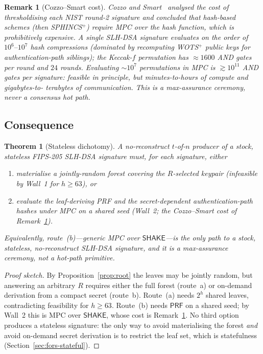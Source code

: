 \documentclass[11pt,a4paper]{article}
\newtheorem{theorem}{Theorem}
\newtheorem{remark}{Remark}
\newcommand{\PRF}{\mathsf{PRF}}
\begin{document}
\begin{remark}[Cozzo--Smart cost]
\label{rem:cs}
Cozzo and Smart~\cite{cozzosmart} analysed the cost of thresholdising each NIST
round-2 signature and concluded that hash-based schemes (then SPHINCS$^+$) require
MPC over the hash function, which is prohibitively expensive. A single SLH-DSA
signature evaluates on the order of $10^{6}\text{--}10^{7}$ hash compressions
(dominated by recomputing WOTS$^+$ public keys for authentication-path siblings);
the Keccak-$f$ permutation has $\approx 1600$ AND gates per round and $24$ rounds.
Evaluating $\sim 10^{7}$ permutations in MPC is $\gtrsim 10^{11}$ AND gates per
signature: feasible in principle, but minutes-to-hours of compute and gigabytes-to-
terabytes of communication. This is a max-assurance ceremony, never a consensus hot
path.
\end{remark}

\subsection{Consequence}
\label{sec:consequence}

\begin{theorem}[Stateless dichotomy]
\label{thm:dichotomy}
A no-reconstruct $t$-of-$n$ producer of a \emph{stock, stateless} FIPS-205 SLH-DSA
signature must, for each signature, either
\begin{enumerate}[label=(\alph*),leftmargin=1.8em]
\item materialise a jointly-random forest covering the $R$-selected keypair
(infeasible by Wall~1 for $h \geq 63$), or
\item evaluate the leaf-deriving PRF and the secret-dependent
authentication-path hashes under MPC on a shared seed (Wall~2; the Cozzo--Smart
cost of Remark~\ref{rem:cs}).
\end{enumerate}
Equivalently, route~(b)---generic MPC over $\mathsf{SHAKE}$---is the only path to a
stock, stateless, no-reconstruct SLH-DSA signature, and it is a max-assurance
ceremony, not a hot-path primitive.
\end{theorem}
\begin{proof}[Proof sketch]
By Proposition~\ref{prop:root} the leaves may be jointly random, but answering an
arbitrary $R$ requires either the full forest (route~a) or on-demand derivation
from a compact secret (route~b). Route~(a) needs $2^h$ shared leaves, contradicting
feasibility for $h \geq 63$. Route~(b) needs $\PRF$ on a shared seed; by Wall~2
this is MPC over $\mathsf{SHAKE}$, whose cost is Remark~\ref{rem:cs}. No third
option produces a stateless signature: the only way to avoid materialising the
forest \emph{and} avoid on-demand secret derivation is to restrict the leaf set,
which is statefulness (Section~\ref{sec:fors-stateful}).
\end{proof}
\end{document}
